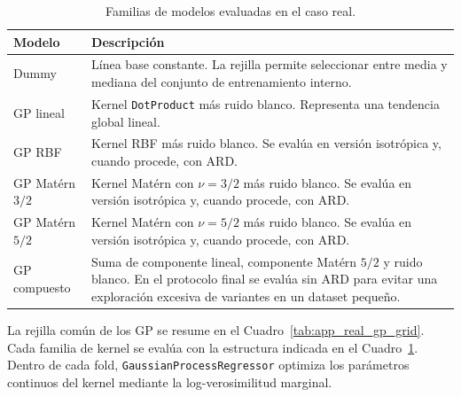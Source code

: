 \begin{table}[htbp]
\centering
\small
\caption[Familias de modelos del caso real]{Familias de modelos evaluadas en el caso real.}
\label{tab:app_real_models}
\renewcommand{\arraystretch}{1.15}
\begin{tabularx}{\textwidth}{@{}p{3.8cm}X@{}}
\toprule
\textbf{Modelo} & \textbf{Descripción} \\
\midrule
Dummy &
Línea base constante. La rejilla permite seleccionar entre media y mediana del conjunto de entrenamiento interno. \\

GP lineal &
Kernel \texttt{DotProduct} más ruido blanco. Representa una tendencia global lineal. \\

GP RBF &
Kernel RBF más ruido blanco. Se evalúa en versión isotrópica y, cuando procede, con ARD. \\

GP Matérn \(3/2\) &
Kernel Matérn con \(\nu=3/2\) más ruido blanco. Se evalúa en versión isotrópica y, cuando procede, con ARD. \\

GP Matérn \(5/2\) &
Kernel Matérn con \(\nu=5/2\) más ruido blanco. Se evalúa en versión isotrópica y, cuando procede, con ARD. \\

GP compuesto &
Suma de componente lineal, componente Matérn \(5/2\) y ruido blanco. En el protocolo final se evalúa sin ARD para evitar una exploración excesiva de variantes en un dataset pequeño. \\
\bottomrule
\end{tabularx}
\end{table}
\FloatBarrier

La rejilla común de los GP se resume en el Cuadro~\ref{tab:app_real_gp_grid}. Cada familia de kernel se evalúa con la estructura indicada en el Cuadro~\ref{tab:app_real_models}. Dentro de cada fold, \texttt{GaussianProcessRegressor} optimiza los parámetros continuos del kernel mediante la log-verosimilitud marginal.

